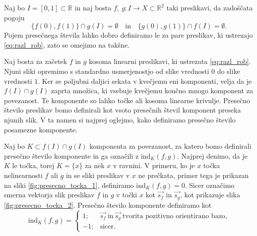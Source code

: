 \documentclass[mat1]{fmfdelo}
\newcommand{\R}{\mathbb R}
\newcommand{\ind}[3][]{\text{ind}_{#1}(#2, #3)}
\begin{document}
Naj bo $I = [0, 1] \subset \R$ in naj bosta $f,\ g \colon I \to X \subset \R^2$ taki preslikavi, da zadoščata pogoju
\begin{equation}\label{eq:razl_rob}
\{f(0), f(1)\} \cap g(I) = \emptyset \quad \text{in} \quad \{g(0), g(1)\} \cap f(I) = \emptyset.
\end{equation}
Pojem presečnega števila lahko dobro definiramo le za pare preslikav, ki ustrezajo \eqref{eq:razl_rob}, zato se omejimo na takšne.

Naj bosta za začetek $f$ in $g$ kosoma linearni preslikavi, ki ustrezata \eqref{eq:razl_rob}. Njuni sliki opremimo s standardno usmerjenostjo od slike vrednosti $0$ do slike vrednosti $1$. Ker se poljubni daljici sekata v kvečjemu eni komponenti, velja da je $f(I) \cap g(I)$ zaprta množica, ki vsebuje kvečjemu končno mnogo komponent za povezanost. Te komponente so lahko točke ali kosoma linearne krivulje. Presečno število preslikav bomo definirali kot vsoto presečnih števil komponent preseka njunih slik. V ta namen si najprej oglejmo, kako definiramo presečno število posamezne komponente.

Naj bo $K \subset f(I) \cap g(I)$ komponenta za povezanost, za katero bomo definirali presečno število komponente in ga označili z $\ind[K]{f}{g}$. Najprej denimo, da je $K$ le točka, torej $K = \{x\}$ za nek $x$ v ravnini. V primeru, ko je $x$ točka nelinearnosti $f$ ali $g$ in se sliki preslikav v $x$ ne prečkata, primer tega je prikazan na sliki \ref{fig:presecno_tocka_1}, definiramo $\ind[K]{f}{g} = 0.$ Sicer označimo smerna vektorja slik preslikav $f$ in $g$ v točki $x$ kot $\overrightarrow{s_f}$ in $\overrightarrow{s_g}$, kot prikazuje slika \ref{fig:presecno_tocka_2}. Presečno število komponente definiramo kot
\begin{equation*}
\ind[K]{f}{g} = \begin{cases}
1; & \overrightarrow{s_f}\ \text{in}\ \overrightarrow{s_g}\ \text{tvorita pozitivno orientirano bazo,}\\
-1; &\text{sicer}.
\end{cases}
\end{equation*}
\end{document}
